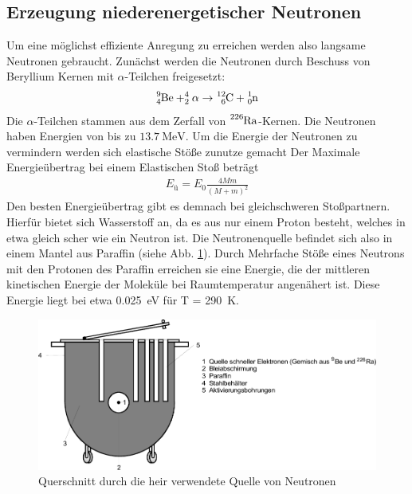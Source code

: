 \subsection{Erzeugung niederenergetischer Neutronen}
Um eine möglichst effiziente Anregung zu erreichen werden also 
langsame Neutronen gebraucht.
Zunächst werden die Neutronen durch Beschuss von Beryllium Kernen mit 
$\alpha$-Teilchen freigesetzt:
\begin{align*}
    \ce{^{9}_{4}Be} + ^{4}_{2}\alpha \rightarrow \ce{^{12}_{6}C} + \ce{_{0}^{1}n}
\end{align*}
Die $\alpha$-Teilchen stammen aus dem Zerfall von $\ce{^{226}Ra}$-Kernen. 
Die Neutronen haben Energien von bis zu $\qty{13.7}{\mega\eV}$. 
Um die Energie der Neutronen zu vermindern werden sich elastische Stöße zunutze gemacht
Der Maximale Energieübertrag bei einem Elastischen Stoß beträgt
\begin{align*}
    E_\text{ü} = E_0 \frac{4Mm}{\left(M + m\right)^2}
\end{align*}
Den besten Energieübertrag gibt es demnach bei gleichschweren Stoßpartnern.
Hierfür bietet sich Wasserstoff an, da es aus nur einem Proton besteht, welches in etwa
gleich scher wie ein Neutron ist. 
Die Neutronenquelle befindet sich also in einem Mantel aus Paraffin (siehe Abb. \ref{fig:neutronenquelle}).
Durch Mehrfache Stöße eines Neutrons mit den Protonen des Paraffin erreichen sie eine
Energie, die der mittleren kinetischen Energie der Moleküle bei Raumtemperatur angenähert ist.
Diese Energie liegt bei etwa \qty{0.025}{\eV} für T = \qty{290}{\kelvin}.
\begin{figure}
    \centering
    \includegraphics{Abbildungen/Neutronenquelle.pdf}
    \caption{Querschnitt durch die heir verwendete Quelle von Neutronen \cite[vgl.]{man:v702}}
    \label{fig:neutronenquelle}
\end{figure}



